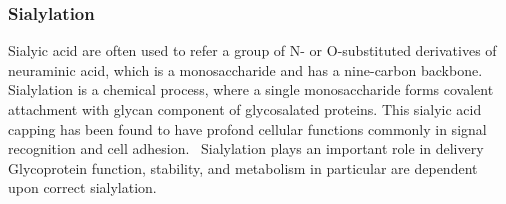 \subsubsection {Sialylation}
Sialyic acid are often used to refer a group of N- or O-substituted derivatives of neuraminic acid, which is a monosaccharide and has a nine-carbon backbone.~\cite{Vocadlo_2009} Sialylation is a chemical process, where a single monosaccharide forms covalent attachment with glycan component of glycosalated proteins. This sialyic acid capping has been found to have profond cellular functions commonly in signal recognition and cell adhesion.~\cite{Bhide_2016} Sialylation plays an important role in delivery  Glycoprotein function, stability, and metabolism in particular are dependent upon correct sialylation.